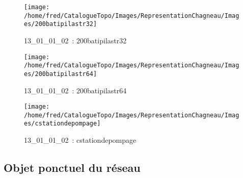 \documentclass[12pt,titlepage]{book}
\begin{document}
\begin{figure}[h!]
  \begin{minipage}[t]{3cm}
    \begin{center}
      \texttt{[image: /home/fred/CatalogueTopo/Images/RepresentationChagneau/Images/200batipilastr32]}
      \caption[~13\_01\_01\_02]{\small{13\_01\_01\_02~:} \tiny{200batipilastr32}}\label{200batipilastr32}
    \end{center}
  \end{minipage}
  \begin{minipage}[t]{3cm}
    \begin{center}
      \texttt{[image: /home/fred/CatalogueTopo/Images/RepresentationChagneau/Images/200batipilastr64]}
      \caption[~13\_01\_01\_02]{\small{13\_01\_01\_02~:} \tiny{200batipilastr64}}\label{200batipilastr64}
    \end{center}
  \end{minipage}
  \begin{minipage}[t]{3cm}
    \begin{center}
      \texttt{[image: /home/fred/CatalogueTopo/Images/RepresentationChagneau/Images/cstationdepompage]}
      \caption[~13\_01\_01\_02]{\small{13\_01\_01\_02~:} \tiny{cstationdepompage}}\label{cstationdepompage}
    \end{center}
  \end{minipage}
\end{figure}


\subsection{Objet ponctuel du réseau}
\noindent
\vspace{\baselineskip}
\end{document}
